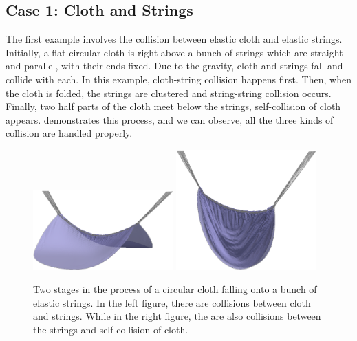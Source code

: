 \subsection{Case 1: Cloth and Strings}
The first example involves the collision between elastic cloth and elastic
strings.
Initially, a flat circular cloth is right above a bunch of strings which are
straight and parallel, with their ends fixed.
Due to the gravity, cloth and strings fall and collide with each.
In this example, cloth-string collision happens first.
Then, when the cloth is folded, the strings are clustered and string-string
collision occurs.
Finally, two half parts of the cloth meet below the strings, self-collision
of cloth appears.
 demonstrates this process, and we can observe,
all the three kinds of collision are handled properly.
\begin{figure}[!ht]
\centering
\includegraphics[width=0.48\textwidth]{figures/fall_string_0}
\includegraphics[width=0.48\textwidth]{figures/fall_string_1}
\caption{Two stages in the process of a circular cloth falling onto a
bunch of elastic strings. In the left figure, there are collisions between
cloth and strings. While in the right figure, the are also collisions
between the strings and self-collision of cloth.}
\label{fig:fall_string}
\end{figure}

